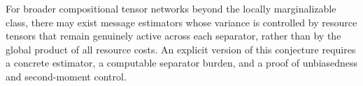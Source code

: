 \begin{conjecture}
\label{conj:general-separator}
For broader compositional tensor networks beyond the locally marginalizable class, there may exist message estimators whose variance is controlled by resource tensors that remain genuinely active across each separator, rather than by the global product of all resource costs. An explicit version of this conjecture requires a concrete estimator, a computable separator burden, and a proof of unbiasedness and second-moment control.
\end{conjecture}
